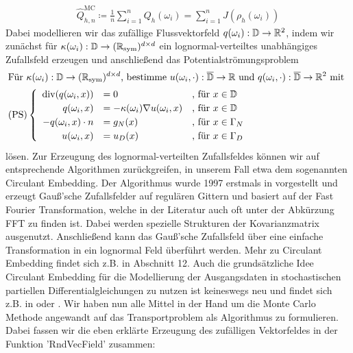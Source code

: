 \begin{align}
	\label{MC-Schätzer}
	\widehat{Q}_{h,n}^{\text{MC}} \coloneqq \frac{1}{n} \sum_{i=1}^{n} Q_h(\omega_i) = \sum_{i=1}^{n} J(\rho_h(\omega_i))
\end{align}
Dabei modellieren wir das zufällige Flussvektorfeld $ q(\omega_i)  : \mathbb{D} \to \mathbb{R}^2 $, indem wir zunächst für $ \kappa(\omega_i) : \mathbb{D} \rightarrow (\mathbb{R}_{\text{sym}})^{d \times d} $ ein lognormal-verteiltes unabhängiges Zufallsfeld erzeugen und anschließend das Potentialströmungsproblem
\begin{align*}
\setlength\arraycolsep{1pt}
&\text{Für } \kappa(\omega_i) : \mathbb{D} \rightarrow (\R_{\text{sym}})^{d \times d} \text{, bestimme } u(\omega_i,\cdot):\overline{\mathbb{D}} \to \R \text{ und } q(\omega_i, \cdot): \overline{\mathbb{D}} \to \R^2 \text{ mit } \\
&\text{(PS)}
\begin{cases}
\begin{array}{rlll}
\dive (q(\omega_i,x)) &= 0  &\text{, für } x \in \mathbb{ D}\\  
q(\omega_i,x) &= - \kappa(\omega_i) \nabla u(\omega_i,x)  &\text{, für } x \in \mathbb{D}\\
-q(\omega_i,x) \cdot n &= g_N(x)  &\text{, für } x \in \Gamma_N \\
u(\omega_i,x) &= u_D(x)  &\text{, für } x \in \Gamma_D \\
\end{array}
\end{cases} \\
\end{align*}
lösen. Zur Erzeugung des lognormal-verteilten Zufallsfeldes können wir auf entsprechende Algorithmen zurückgreifen, in unserem Fall etwa dem sogenannten Circulant Embedding.
Der Algorithmus wurde 1997 erstmals in \cite{dietrich1997fast} vorgestellt und 
erzeugt Gauß'sche Zufallsfelder auf regulären Gittern und basiert auf der Fast Fourier Transformation, welche in der Literatur auch oft unter der Abkürzung FFT zu finden ist.
Dabei werden spezielle Strukturen der Kovarianzmatrix ausgenutzt. Anschließend kann das Gauß'sche Zufallsfeld über eine einfache Transformation in ein lognormal Feld überführt werden. Mehr zu Circulant Embedding findet sich z.B. in \cite{schmidt2014stochastic} Abschnitt 12.
Auch die grundsätzliche Idee Circulant Embedding für die Modellierung der Ausgangsdaten in stochastischen partiellen Differentialgleichungen zu nutzen ist keineswegs neu und findet sich z.B. in \cite{charrier2012strong} oder \cite{cliffe2011multilevel}.
Wir haben nun alle Mittel in der Hand um die Monte Carlo Methode angewandt auf das Transportproblem als Algorithmus zu formulieren. Dabei fassen wir die eben erklärte Erzeugung des zufälligen Vektorfeldes in der Funktion 'RndVecField' zusammen:

